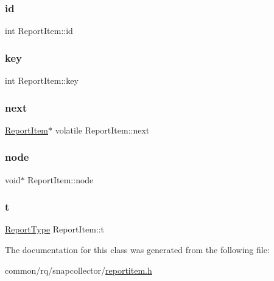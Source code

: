 \subsubsection{\texorpdfstring{id}{id}}
{\footnotesize\ttfamily int Report\+Item\+::id}

\mbox{\label{classReportItem_a04d13a1753f531648fa47a887d8c3a48}} 
\subsubsection{\texorpdfstring{key}{key}}
{\footnotesize\ttfamily int Report\+Item\+::key}

\mbox{\label{classReportItem_a52ab69e393261dc12f3a57091c7a4b35}} 
\subsubsection{\texorpdfstring{next}{next}}
{\footnotesize\ttfamily \hyperlink{classReportItem}{Report\+Item}$\ast$ volatile Report\+Item\+::next}

\mbox{\label{classReportItem_a23dfae0f15cac8c240e32b4c029e22e5}} 
\subsubsection{\texorpdfstring{node}{node}}
{\footnotesize\ttfamily void$\ast$ Report\+Item\+::node}

\mbox{\label{classReportItem_a218d05d57bdd0f78ef0b73ec357716a5}} 
\subsubsection{\texorpdfstring{t}{t}}
{\footnotesize\ttfamily \hyperlink{reportitem_8h_ae4f179a72db5cca021a37ec4c6fe4c68}{Report\+Type} Report\+Item\+::t}



The documentation for this class was generated from the following file\+:\begin{DoxyCompactItemize}
\item 
common/rq/snapcollector/\hyperlink{reportitem_8h}{reportitem.\+h}\end{DoxyCompactItemize}
